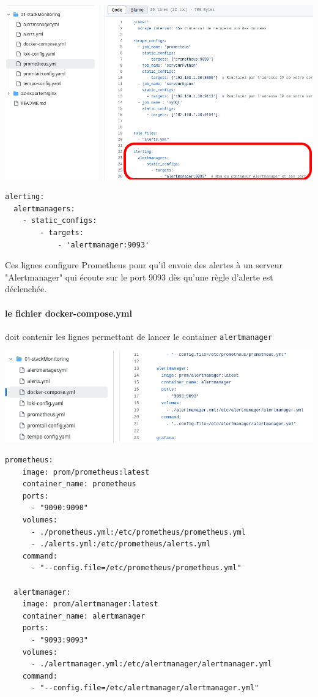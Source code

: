 \documentclass[french, 12pt]{article}%
\begin{document}
\begin{center}
\includegraphics[scale=0.4]{./ressource/alertSouligne}
\end{center}

\begin{lstlisting}[style=commande]  
alerting:
  alertmanagers:
    - static_configs:
        - targets:
            - 'alertmanager:9093'
\end{lstlisting}
Ces lignes configure Prometheus pour qu’il envoie des alertes à un serveur "Alertmanager" qui écoute sur le port 9093 dès qu'une règle d'alerte est déclenchée.

\paragraph{le fichier docker-compose.yml} doit contenir les lignes permettant de lancer le container \verb?alertmanager?

\begin{center}
\includegraphics[scale=0.4]{./ressource/dockerAlert}
\end{center}

\begin{lstlisting}[style=commande] 
prometheus:
    image: prom/prometheus:latest
    container_name: prometheus
    ports:
      - "9090:9090"
    volumes:
      - ./prometheus.yml:/etc/prometheus/prometheus.yml
      - ./alerts.yml:/etc/prometheus/alerts.yml
    command:
      - "--config.file=/etc/prometheus/prometheus.yml"

  alertmanager:
    image: prom/alertmanager:latest
    container_name: alertmanager
    ports:
      - "9093:9093"
    volumes:
      - ./alertmanager.yml:/etc/alertmanager/alertmanager.yml
    command:
      - "--config.file=/etc/alertmanager/alertmanager.yml"
\end{lstlisting}      
     
\end{document}
